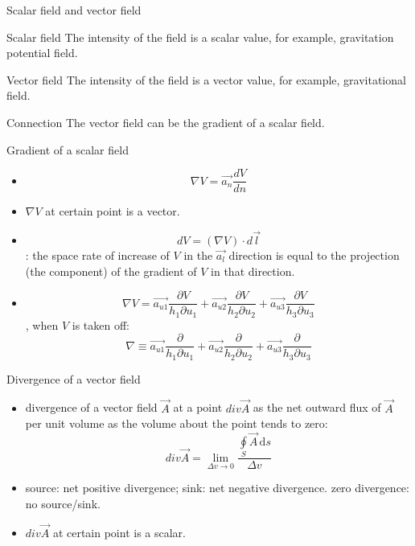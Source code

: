 \documentclass[xcolor={dvipsnames}]{beamer}
\begin{document}
\begin{frame}{Scalar field and vector field}

\begin{block}{Scalar field}
The intensity of the field is a scalar value, for example, gravitation potential field.
\end{block}
\pause
\begin{block}{Vector field}
The intensity of the field is a vector value, for example, gravitational field.
\end{block}
\pause
\begin{block}{Connection}
The vector field can be the gradient of a scalar field.
\end{block}
\end{frame}
\begin{frame}{Gradient of a scalar field}

\begin{itemize}
    \item $$\nabla V = \vec{a_n} \frac{dV}{dn}$$
    \item $\nabla V$ at certain point is a vector.
    \item $$dV = (\nabla V)\cdot d\vec{l}$$: the space rate of increase of $V$ in the $\vec{a_l}$ direction is equal to the projection (the component) of the gradient of $V$ in that direction. 
    \item $$
        \nabla V = \vec{a_{u1}} \frac{\partial V}{h_1\partial u_1} + \vec{a_{u2}}\frac{\partial V}{h_2\partial u_2} + \vec{a_{u3}} \frac{\partial V}{h_3\partial u_3}
    $$, when $V$ is taken off:
    $$
    \nabla \equiv  \vec{a_{u1}} \frac{\partial }{h_1\partial u_1} + \vec{a_{u2}}\frac{\partial }{h_2\partial u_2} + \vec{a_{u3}} \frac{\partial }{h_3\partial u_3}
    $$
\end{itemize}
\end{frame}
\begin{frame}{Divergence of a vector field}
\begin{itemize}
    \item divergence of a vector field $\vec{A}$ at a point $div\vec{A}$ as the net outward flux of $\vec{A}$ per unit volume as the volume about the point tends to zero: 
    \begin{equation}\label{Eq: definition-divergence-of-vector-field}
        div\vec{A} = \lim_{\Delta v\to 0}\frac{\oint\limits_{S}\vec{A}\,\mathrm{d}s}{\Delta v} 
    \end{equation}
 
    \item source: net positive divergence; sink: net negative divergence. zero divergence: no source/sink.
    \item $div\vec{A}$ at certain point is a scalar.
\end{itemize}

\end{frame}
\end{document}
